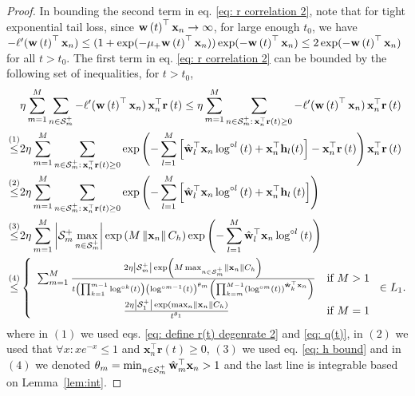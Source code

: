 \documentclass[twoside,11pt,english]{article}
\begin{document}
\begin{proof}
In bounding the second term in eq. \ref{eq: r correlation 2}, note that for tight exponential tail loss, since $\mathbf{w}\left(t\right)^{\top}\mathbf{x}_{n}\to\infty$, for large enough $t_0$, we have $-\ell'(\mathbf{w}\left(t\right)^{\top}\mathbf{x}_{n})\le (1+\exp(-\mu_+\mathbf{w}\left(t\right)^{\top}\mathbf{x}_{n}))\exp(-\mathbf{w}\left(t\right)^{\top}\mathbf{x}_{n})\le 2\exp(-\mathbf{w}\left(t\right)^{\top}\mathbf{x}_{n})$ for all $t>t_0$. 
The first term in eq. \ref{eq: r correlation 2} can be bounded by the following set of inequalities, for $t>t_0$, 
\begin{align}
 & \eta\sum_{m=1}^{M}\sum_{n\in\mathcal{S}_{m}^{+}}-\ell'(\mathbf{w}\left(t\right)^{\top}\mathbf{x}_{n})\,\mathbf{x}_{n}^{\top}\mathbf{r}\left(t\right)\le \eta\sum_{m=1}^{M}\sum_{n\in\mathcal{S}_{m}^{+}:\,\mathbf{x}_{n}^{\top}\mathbf{r}\left(t\right)\geq0}-\ell'(\mathbf{w}\left(t\right)^{\top}\mathbf{x}_{n})\,\mathbf{x}_{n}^{\top}\mathbf{r}\left(t\right)\nonumber \\
\overset{\left(1\right)}{\leq} & 2\eta\sum_{m=1}^{M}\sum_{n\in\mathcal{S}_{m}^{+}:\,\mathbf{x}_{n}^{\top}\mathbf{r}\left(t\right)\geq0}\exp\left(-\sum_{l=1}^{M}\left[\hat{\mathbf{w}}_{l}^{\top}\mathbf{x}_{n}\log^{\circ l}\left(t\right)+\mathbf{x}_{n}^{\top}\mathbf{h}_{l}(t)\right]-\mathbf{x}_{n}^{\top}\mathbf{r}\left(t\right)\right)\mathbf{x}_{n}^{\top}\mathbf{r}\left(t\right)\nonumber \\
\overset{\left(2\right)}{\leq} & 2\eta\sum_{m=1}^{M}\sum_{n\in\mathcal{S}_{m}^{+}:\,\mathbf{x}_{n}^{\top}\mathbf{r}\left(t\right)\geq0}\exp\left(-\sum_{l=1}^{M}\left[\hat{\mathbf{w}}_{l}^{\top}\mathbf{x}_{n}\log^{\circ l}\left(t\right)+\mathbf{x}_{n}^{\top}\mathbf{h}_{l}\left(t\right)\right]\right)\nonumber \\
\overset{\left(3\right)}{\leq} & 2\eta\sum_{m=1}^M\left|\mathcal{S}_{m}^{+}\max_{n\in \mathcal{S}_m^+}\right|\exp\left(M\left\Vert \mathbf{x}_{n}\right\Vert C_{h}\right)\exp\left(-\sum_{l=1}^{M}\hat{\mathbf{w}}_{l}^{\top}\mathbf{x}_{n}\log^{\circ l}\left(t\right)\right)\nonumber \\
\overset{\left(4\right)}{\leq} &\left\{\begin{array}{cc} \sum_{m=1}^M\frac{2\eta\left|\mathcal{S}_{m}^{+}\right|\exp\left(M\max_{n\in \mathcal{S}_m^+}\left\Vert \mathbf{x}_{n}\right\Vert C_{h}\right)}{t\left(\prod_{k=1}^{m-1}\log^{\circ k}\left(t\right)\right)\left(\log^{\circ m-1}\left(t\right)\right)^{\theta_{m}}\left(\prod_{k=m}^{M-1}\left(\log^{\circ m}\left(t\right)\right)^{\mathbf{\hat{w}}_{k}^{\top}\mathbf{x}_{n}}\right)} & \text{if }M>1\\
\frac{2\eta\left|\mathcal{S}_{1}^{+}\right|\exp\left(\max_{n}\left\Vert \mathbf{x}_{n}\right\Vert C_{h}\right)}{t^{\theta_{1}}}& \text{if }M=1
\end{array}\right.\in L_1.\label{eq: bound on non-SV gradient-1}
\end{align}
where in $\left(1\right)$ we used eqs. \ref{eq: define r(t) degenrate 2}
and \ref{eq: q(t)}, in $\left(2\right)$ we used that $\forall x: xe^{-x}\leq1$
and $\mathbf{x}_{n}^{\top}\mathbf{r}\left(t\right)\geq0$, $\left(3\right)$ we
used eq. \ref{eq: h bound} and in $\left(4\right)$ we denoted $\theta_{m}=\min_{n\in\mathcal{S}_{m}^{+}}\hat{\mathbf{w}}_{m}^{\top}\mathbf{x}_{n}>1$ and the last line is integrable based on Lemma~\ref{lem:int}. 


\end{proof}
\end{document}

